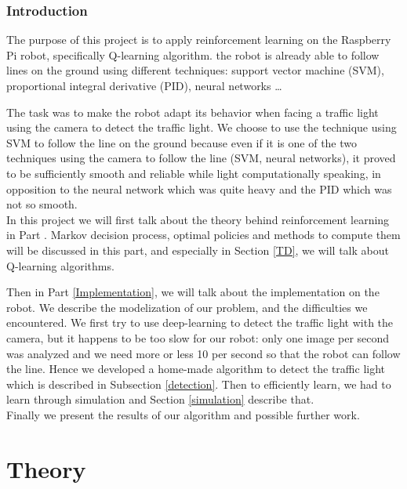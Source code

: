 \documentclass[14pt,a4paper]{article}
\let\oldpart\part
\renewcommand\part{\newpage\oldpart}
\theoremstyle{definition}
\begin{document}
\tableofcontents
{}
\newpage
{}





\section*{Introduction}

The purpose of this project is to apply reinforcement learning on the Raspberry Pi robot, specifically Q-learning algorithm. the robot is already able to follow lines on the ground using different techniques: support vector machine (SVM), proportional integral derivative (PID), neural networks \ldots 

The task was to make the robot adapt its behavior when facing a traffic light using the camera to detect the traffic light. We choose to use the technique using SVM to follow the line on the ground because even if it is one of the two techniques using the camera to follow the line (SVM, neural networks), it proved to be sufficiently smooth and reliable while light computationally speaking, in opposition to the neural network which was quite heavy and the PID which was not so smooth.\\


In this project we will first talk about the theory behind reinforcement learning in Part \ref{Theory}. Markov decision process, optimal policies and methods to compute them will be discussed in this part, and especially in Section \ref{TD}, we will talk about Q-learning algorithms. 

Then in Part \ref{Implementation}, we will talk about the implementation on the robot. We describe the modelization of our problem, and the difficulties we encountered.  We first try to use deep-learning to detect the traffic light with the camera, but it happens to be too slow for our robot: only one image per second was analyzed and we need more or less 10 per second so that the robot can follow the line. Hence we developed a home-made algorithm to detect the traffic light which is described in Subsection \ref{detection}. Then to efficiently learn, we had to learn through simulation and Section \ref{simulation} describe that. \\

Finally we present the results of our algorithm and possible further work.


\newpage
\part{Theory} \label{Theory}
\end{document}
